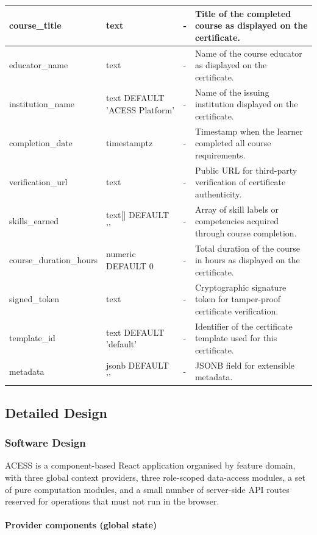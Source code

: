 \documentclass[12pt, oneside]{article} %
\newcommand{\tabbreak}{\hyphenpenalty=200\exhyphenpenalty=200\tolerance=4000\hbadness=10000\hspace{0pt}}
\begin{document}
{\begin{longtable}{|>{\raggedright\arraybackslash\tabbreak}p{2.67cm}|>{\raggedright\arraybackslash\tabbreak}p{2.93cm}|>{\raggedright\arraybackslash\tabbreak}p{2.67cm}|>{\raggedright\arraybackslash\tabbreak}p{4.51cm}|}
course\_title & text & - & Title of the completed course as displayed on the certificate. \\ \hline
educator\_name & text & - & Name of the course educator as displayed on the certificate. \\ \hline
institution\_name & text DEFAULT 'ACESS Platform' & - & Name of the issuing institution displayed on the certificate. \\ \hline
completion\_date & timestamptz & - & Timestamp when the learner completed all course requirements. \\ \hline
verification\_url & text & - & Public URL for third-party verification of certificate authenticity. \\ \hline
skills\_earned & text[] DEFAULT '{}' & - & Array of skill labels or competencies acquired through course completion. \\ \hline
course\_duration\_hours & numeric DEFAULT 0 & - & Total duration of the course in hours as displayed on the certificate. \\ \hline
signed\_token & text & - & Cryptographic signature token for tamper-proof certificate verification. \\ \hline
template\_id & text DEFAULT 'default' & - & Identifier of the certificate template used for this certificate. \\ \hline
metadata & jsonb DEFAULT '{}' & - & JSONB field for extensible metadata. \\ \hline
\end{longtable}
}

\subsection{Detailed Design}

\subsubsection{Software Design}

ACESS is a component-based React application organised by feature domain, with three global context providers, three role-scoped data-access modules, a set of pure computation modules, and a small number of server-side API routes reserved for operations that must not run in the browser.

\paragraph{Provider components (global state)}
\end{document}
